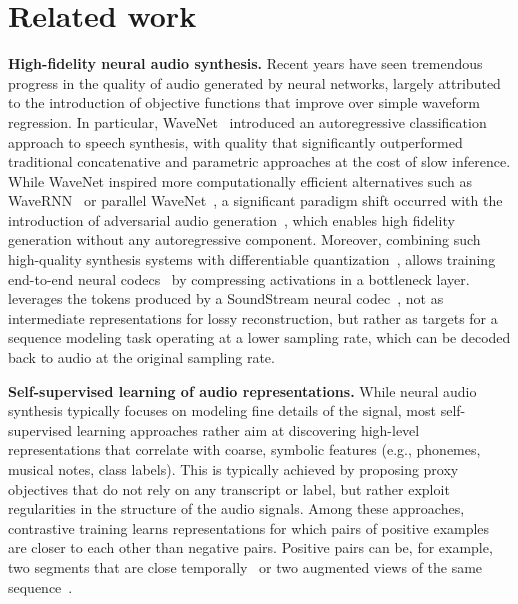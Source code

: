 \documentclass[letterpaper,10 pt]{IEEEtran}
\begin{document}
\section{Related work}
\noindent
\textbf{High-fidelity neural audio synthesis.} Recent years have seen tremendous progress in the quality of audio generated by neural networks, largely attributed to the introduction of objective functions that improve over simple waveform regression. In particular, WaveNet~\cite{oord2016wavenet} introduced an autoregressive classification approach to speech synthesis, with quality that significantly outperformed traditional concatenative and parametric approaches at the cost of slow inference. While WaveNet inspired more computationally efficient alternatives such as WaveRNN~\cite{kalchbrenner2018wavernn} or parallel WaveNet~\cite{parallel_wavenet}, a significant paradigm shift occurred with the introduction of adversarial audio generation~\cite{kumar2019melgan, gantts, kong2020hifigan}, which enables high fidelity generation without any autoregressive component. Moreover, combining such high-quality synthesis systems with differentiable quantization~\cite{vqvae, vqvae2, softhardquantization}, allows training end-to-end neural codecs~\cite{kankanahalli2018speechdnn, zhen2019cascaded, soundstream, petermann2021harp} by compressing activations in a bottleneck layer. \ours{} leverages the tokens produced by a SoundStream neural codec~\cite{soundstream}, not as intermediate representations for lossy reconstruction, but rather as targets for a sequence modeling task operating at a lower sampling rate, which can be decoded back to audio at the original sampling rate.

\noindent
\textbf{Self-supervised learning of audio representations.} While neural audio synthesis typically focuses on modeling fine details of the signal, most self-supervised learning approaches rather aim at discovering high-level representations that correlate with coarse, symbolic features (e.g., phonemes, musical notes, class labels). This is typically achieved by proposing proxy objectives that do not rely on any transcript or label, but rather exploit regularities in the structure of the audio signals. Among these approaches, contrastive training learns representations for which pairs of positive examples are closer to each other than negative pairs. Positive pairs can be, for example, two segments that are close temporally~\cite{cpc,wav2vec2,cola} or two augmented views of the same sequence~\cite{contrastive_kharitonov}. 
\end{document}
